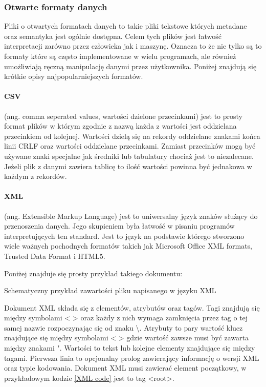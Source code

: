 \subsubsection{Otwarte formaty danych}

Pliki o otwartych formatach danych to takie pliki tekstowe których metadane oraz semantyka jest ogólnie dostępna. 
Celem tych plików jest łatwość interpretacji zarówno przez człowieka jak i maszynę. 
Oznacza to że nie tylko są to formaty które są często implementowane w wielu programach, ale również umożliwiają ręczną manipulację danymi przez użytkownika.  
Poniżej znajdują się krótkie opisy najpopularniejszych formatów.

\paragraph{CSV}
(ang. comma seperated values, wartości dzielone przecinkami) jest to prosty format plików w którym zgodnie z nazwą każda z wartości jest oddzielana przecinkiem od kolejnej. Wartości dzielą się na rekordy oddzielane znakami końca linii CRLF oraz wartości oddzielane przecinkami. Zamiast przecinków mogą być używane znaki specjalne jak średniki lub tabulatury chociaż jest to niezalecane. Jeżeli plik z danymi zawiera tablicę to ilość wartości powinna być jednakowa w każdym z rekordów. 

\paragraph{XML}
(ang. Extensible Markup Language) jest to uniwersalny język znaków służący do przenoszenia danych. Jego skupieniem była łatwość w pisaniu programów interpretujących ten standard.
Jest to język na podstawie którego stworzono wiele ważnych pochodnych formatów takich jak Microsoft Office XML formats, Trusted Data Format i HTML5.

Poniżej znajduje się prosty przykład takiego dokumentu:
\begin{kod}
        
        \caption{Schematyczny przykład zawartości pliku napisanego w języku XML}
        \label{XML code}
\end{kod}

Dokument XML składa się z elementów, atrybutów oraz tagów. 
Tagi znajdują się między symbolami < > oraz każdy z nich wymaga zamknięcia przez tag o tej samej nazwie rozpoczynając się od znaku \textbackslash.
Atrybuty to pary wartość klucz znajdujące się między symbolami < > gdzie wartość zawsze musi być zawarta między znakami ".
Wartości to tekst lub kolejne elementy znajdujące się między tagami. 
Pierwsza linia to opcjonalny prolog zawierający informację o wersji XML oraz typie kodowania.  
Dokument XML musi zawierać element początkowy, w przykładowym kodzie \ref{XML code} jest to tag <root>.

